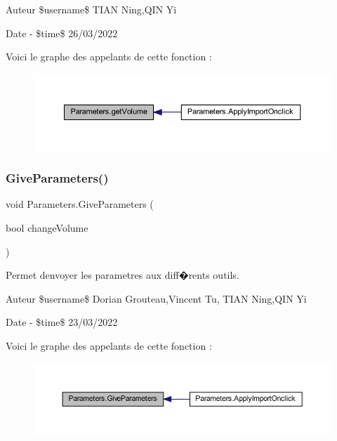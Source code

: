 \begin{DoxyAuthor}{Auteur}
\$username\$ T\+I\+AN Ning,Q\+IN Yi 
\end{DoxyAuthor}
\begin{DoxyDate}{Date}
-\/ \$time\$ 26/03/2022 
\end{DoxyDate}
Voici le graphe des appelants de cette fonction \+:
\nopagebreak
\begin{figure}[H]
\begin{center}
\leavevmode
\includegraphics[width=350pt]{class_parameters_a5e16007361a29535bbad70f4f0a466bc_icgraph}
\end{center}
\end{figure}
\mbox{\label{class_parameters_abc57bdbb6a4e2f78c7d71f1fa26b5fe8}} 
\subsubsection{\texorpdfstring{Give\+Parameters()}{GiveParameters()}}
{\footnotesize\ttfamily void Parameters.\+Give\+Parameters (\begin{DoxyParamCaption}\item[{bool}]{change\+Volume }\end{DoxyParamCaption})\hspace{0.3cm}{\ttfamily [inline]}}



Permet d\textquotesingle{}envoyer les parametres aux diff�rents outils. 

\begin{DoxyAuthor}{Auteur}
\$username\$ Dorian Grouteau,Vincent Tu, T\+I\+AN Ning,Q\+IN Yi 
\end{DoxyAuthor}
\begin{DoxyDate}{Date}
-\/ \$time\$ 23/03/2022 
\end{DoxyDate}
Voici le graphe des appelants de cette fonction \+:
\nopagebreak
\begin{figure}[H]
\begin{center}
\leavevmode
\includegraphics[width=350pt]{class_parameters_abc57bdbb6a4e2f78c7d71f1fa26b5fe8_icgraph}
\end{center}
\end{figure}
\mbox{\label{class_parameters_a95a34ed3f54953655b8caf704caff1f5}} 

